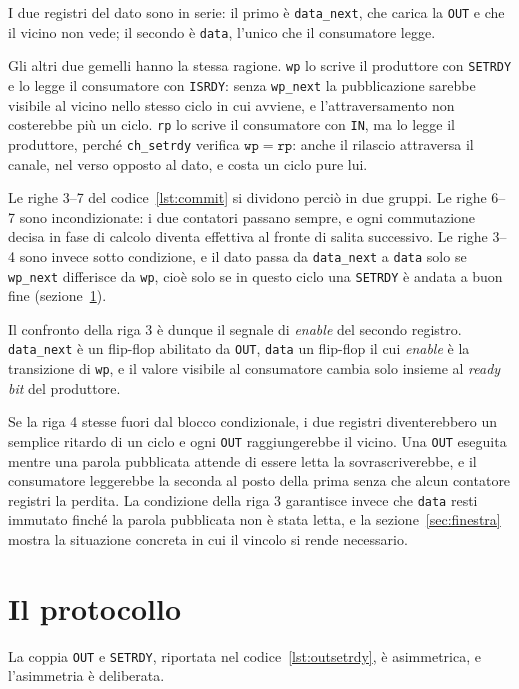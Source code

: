 I due registri del dato sono in serie: il primo è \texttt{data\_next}, che
carica la \texttt{OUT} e che il vicino non vede; il secondo è \texttt{data},
l'unico che il consumatore legge.

Gli altri due gemelli hanno la stessa ragione. \texttt{wp} lo scrive il
produttore con \texttt{SETRDY} e lo legge il consumatore con \texttt{ISRDY}:
senza \texttt{wp\_next} la pubblicazione sarebbe visibile al vicino nello stesso
ciclo in cui avviene, e l'attraversamento non costerebbe più un ciclo.
\texttt{rp} lo scrive il consumatore con \texttt{IN}, ma lo legge il produttore,
perché \texttt{ch\_setrdy} verifica $\mathtt{wp} = \mathtt{rp}$: anche il
rilascio attraversa il canale, nel verso opposto al dato, e costa un ciclo pure
lui.

Le righe 3--7 del codice~\ref{lst:commit} si dividono perciò in due gruppi. Le
righe 6--7 sono incondizionate: i due contatori passano sempre, e ogni
commutazione decisa in fase di calcolo diventa effettiva al fronte di salita
successivo. Le righe
3--4 sono invece sotto condizione, e il dato passa da \texttt{data\_next} a
\texttt{data} solo se \texttt{wp\_next} differisce da \texttt{wp}, cioè solo se
in questo ciclo una \texttt{SETRDY} è andata a buon fine
(sezione~\ref{sec:protocollo}).

Il confronto della riga 3 è dunque il segnale di \emph{enable} del secondo
registro. \texttt{data\_next} è un flip-flop abilitato da \texttt{OUT}, \texttt{data} un
flip-flop il cui \emph{enable} è la transizione di \texttt{wp}, e il valore
visibile al consumatore cambia solo insieme al \emph{ready bit} del produttore.

Se la riga 4 stesse fuori dal blocco condizionale, i due registri diventerebbero
un semplice ritardo di un ciclo e ogni \texttt{OUT} raggiungerebbe il vicino.
Una \texttt{OUT} eseguita mentre una parola pubblicata attende di essere letta
la sovrascriverebbe, e il consumatore leggerebbe la seconda al posto della prima
senza che alcun contatore registri la perdita. La condizione della riga 3
garantisce invece che \texttt{data} resti immutato finché la parola pubblicata
non è stata letta, e la sezione~\ref{sec:finestra} mostra la situazione concreta
in cui il vincolo si rende necessario.


\section{Il protocollo}
\label{sec:protocollo}

La coppia \texttt{OUT} e \texttt{SETRDY}, riportata nel
codice~\ref{lst:outsetrdy}, è asimmetrica, e l'asimmetria è deliberata.

